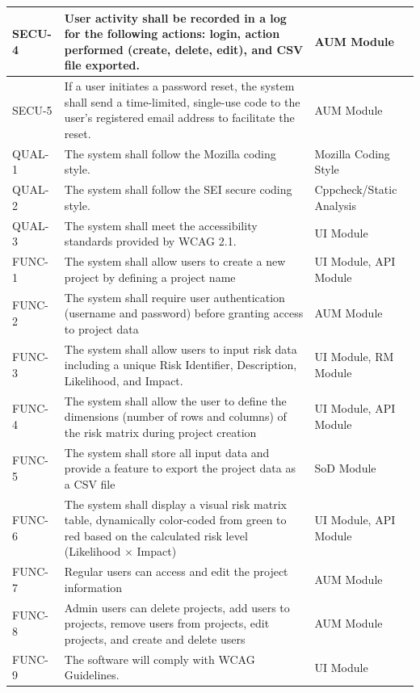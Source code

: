 \documentclass[letterpaper,12pt,oneside,listof=totoc,parskip=full]{scrreprt}
\begin{document}
\begin{longtable}{|l|p{}|l|}
\hline
SECU-4  & User activity shall be recorded in a log for the following actions: login, action performed (create, delete, edit), and CSV file exported. & AUM Module \\
\hline
SECU-5  & If a user initiates a password reset, the system shall send a time-limited, single-use code to the user's registered email address to facilitate the reset. & AUM Module \\
\hline
QUAL-1 & The system shall follow the Mozilla coding style. & Mozilla Coding Style \\
\hline
QUAL-2 & The system shall follow the SEI secure coding style. & Cppcheck/Static Analysis \\
\hline
QUAL-3 & The system shall meet the accessibility standards provided by WCAG 2.1. & UI Module \\
\hline
FUNC-1 & The system shall allow users to create a new project by defining a project name & UI Module, API Module\\
\hline
FUNC-2 & The system shall require user authentication (username and password) before granting access to project data & AUM Module\\
\hline
FUNC-3 & The system shall allow users to input risk data including a unique Risk Identifier, Description, Likelihood, and Impact. & UI Module, RM Module \\
\hline
FUNC-4 & The system shall allow the user to define the dimensions (number of rows and columns) of the risk matrix during project creation & UI Module, API Module\\
\hline
FUNC-5 & The system shall store all input data and provide a feature to export the project data as a CSV file & SoD Module\\
\hline
FUNC-6 & The system shall display a visual risk matrix table, dynamically color-coded from green to red based on the calculated risk level (Likelihood $\times$ Impact) & UI Module, API Module\\
\hline
FUNC-7 & Regular users can access and edit the project information & AUM Module\\
\hline
FUNC-8 & Admin users can delete projects, add users to projects, remove users from projects, edit projects, and create and delete users & AUM Module\\
\hline
FUNC-9 & The software will comply with WCAG Guidelines. & UI Module\\
\end{longtable}


%
%
\end{document}
